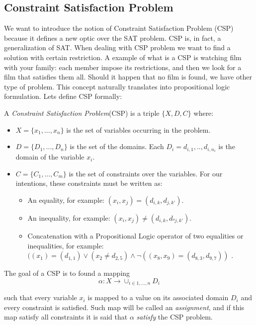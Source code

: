 \subsection{Constraint Satisfaction Problem}
  
We want to introduce the notion of Constraint Satisfaction Problem (CSP) because it defines a new optic over the SAT problem. CSP is, in fact, a generalization of SAT. When dealing with CSP problem we want to find a solution with certain restriction. A example of what is a CSP is watching film with your family: each member impose its restrictions, and then we look for a film that satisfies them all. Should it happen that no film is found, we have other type of problem. This concept naturally translates into propositional logic formulation. Lets define CSP formally:

\begin{definition}
  A \emph{Constraint Satisfaction Problem}(CSP) is a triple $\{X,D,C\}$ where:
  \begin{itemize}
  \item $X=\{x_1,...,x_n\}$ is the set of variables  occurring in the problem.
  \item $D=\{D_1,...,D_n\}$ is the set of the domains. Each $D_i={d_{i,1},..,d_{i,n_i}}$ is the domain of the variable $x_i$.
  \item $C=\{C_1,...,C_m\}$ is the set of constraints over the variables. For our intentions, these constraints must be written as:
    \begin{itemize}
    \item An equality, for example: $(x_i, x_j) = (d_{i,k}, d_{j,k'})$.
    \item An inequality, for example: $(x_i, x_j) \ne (d_{i,k}, d_{ºj,k'})$.
    \item Concatenation with a Propositional Logic operator of two equalities or inequalities, for example: $((x_1) = (d_{1,1}) \vee (x_2 \ne d_{2,5}) \wedge \neg((x_8,x_9) = (d_{8,3},d_{9,7}))$ .
    \end{itemize}
  \end{itemize}
\end{definition}
  The goal of a CSP is to found a mapping \[ \alpha:X\to \cup_{i\in 1,...,n} D_i\]
  
  such that every variable $x_i$ is mapped to a value on its associated domain $D_i$ and every constraint is satisfied. Such map will be called an \emph{assignment}, and if this map satisfy all constraints it is said that $\alpha$ \emph{satisfy} the CSP problem.\\


